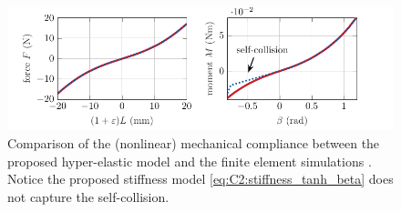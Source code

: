 
\begin{figure}[!t]
  \vspace{-1mm}
   \hspace{-2mm}
   \includegraphics*{./pdf/thesis-figure-4-8.pdf}
   \vspace{-0.5cm}
   \caption{\small Comparison of the (nonlinear) mechanical compliance between the proposed hyper-elastic model  and the finite element simulations . Notice the proposed stiffness model \eqref{eq:C2:stiffness_tanh_beta} does not capture the self-collision. }
   \vspace{-0.1cm}
   \label{fig:C2:fem_stiffness_recover_compare}
 \end{figure}
 

